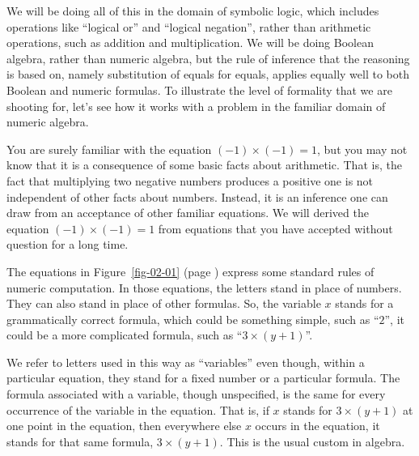 We will be doing all of this in the domain of symbolic logic, which
includes operations like ``logical or'' and ``logical negation'',
rather than arithmetic operations, such as addition and
multiplication.
We will be doing Boolean algebra, rather than numeric algebra, 
but the rule of inference that the reasoning is based on, 
namely substitution of equals for equals,
applies equally well to both Boolean and numeric formulas.
To illustrate the level of formality that we are shooting for,
let's see how it works with a problem 
in the familiar domain of numeric algebra.

You are surely familiar with the equation $(-1)\times(-1) = 1$, but you may
not know that it is a consequence of some basic facts about
arithmetic.
That is, the fact that multiplying two
negative numbers produces a positive one
is not independent of other facts about numbers.
Instead, it is an inference one can draw
from an acceptance of other familiar equations.
We will derived the equation $(-1)\times(-1) = 1$
from equations that you have accepted without question for a long time.

The equations in Figure~\ref{fig-02-01} (page \pageref{fig-02-01})
express some standard rules of numeric computation.
In those equations, the letters stand in
place of numbers. They can also stand in place of other
formulas.
So, the variable $x$ stands for a grammatically correct formula,
which could be something simple, such as ``$2$'',
it could be a more complicated formula, such as ``$3\times(y + 1)$''.

We refer to letters used in this way as
``variables'' even though, within a particular equation, they
stand for a fixed number or a particular formula.
The formula associated with a variable, though unspecified,
is the same for every occurrence of the variable in the equation.
That is, if $x$ stands for $3\times(y + 1)$ at one point in the
equation, then everywhere else $x$ occurs in the equation,
it stands for that same formula, $3\times(y + 1)$.
This is the usual custom in algebra.

